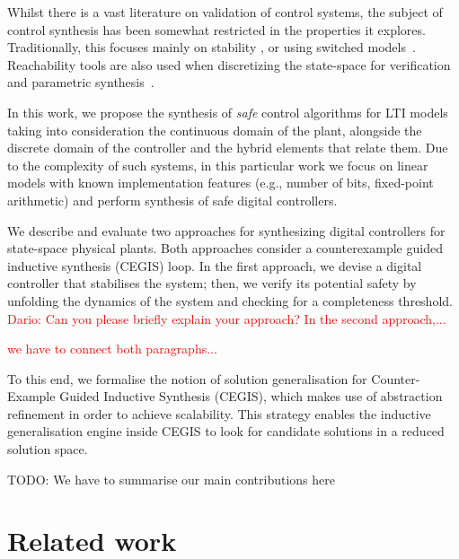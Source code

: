 \documentclass[runningheads,a4paper]{llncs}
\newcommand{\addtodo}[1]{{\color{red} TODO: #1}}
\begin{document}
Whilst there is a vast literature on validation of control systems,
the subject of control synthesis has been somewhat restricted in the
properties it explores.  Traditionally, this focuses mainly on stability %
\cite{DBLP:journals/corr/AbateBCCDKK16,sadabadi2016static}, or using switched
models~\cite{DBLP:conf/emsoft/RavanbakhshS16}.
Reachability tools are
also used when discretizing the state-space for verification and
parametric synthesis~\cite{cimatti2013parameter}.

In this work, we propose the synthesis of \emph{safe} control algorithms for
LTI models taking into consideration the continuous domain of the plant, 
alongside the discrete domain of the controller and the hybrid elements that relate them.  
Due to the complexity of such systems, in this particular work we focus
on linear models with known  implementation features (e.g., number of bits, fixed-point
arithmetic) %
and perform %
synthesis of safe digital controllers.

We describe and evaluate two approaches for synthesizing digital controllers 
for state-space physical plants. Both approaches consider a counterexample 
guided inductive synthesis (CEGIS) loop. In the first approach, 
we devise a digital controller that stabilises the system; then, we verify its 
potential safety by unfolding the dynamics of the system and checking for 
a completeness threshold. \textcolor{red}{Dario: Can you please briefly explain your approach?
In the second approach,...}

\textcolor{red}{we have to connect both paragraphs...}

To this end, we formalise the notion of solution generalisation for
Counter-Example Guided Inductive Synthesis (CEGIS), which makes use 
of abstraction refinement in order to achieve scalability.
This strategy enables the inductive generalisation engine inside CEGIS
to look for candidate solutions in a reduced solution space.  

\addtodo{We have to summarise our main contributions here}

\section{Related work}
\label{sec:relw}
\end{document}
